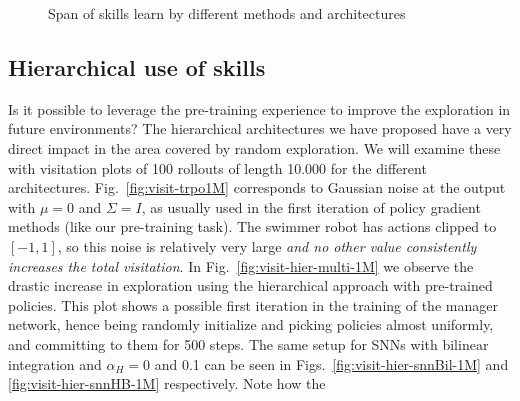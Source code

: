 \documentclass{article} %
\begin{document}
\begin{figure}[h]
{	}
	\caption{Span of skills learn by different methods and architectures}
	\label{fig:visit_methods}
\end{figure}


\subsection{Hierarchical use of skills}

Is it possible to leverage the pre-training experience to improve the exploration in future environments? The hierarchical architectures we have proposed have a very direct impact in the area covered by random exploration. We will examine these with visitation plots of 100 rollouts of length 10.000 for the different architectures. Fig.\ \ref{fig:visit-trpo1M} corresponds to Gaussian noise at the output with $\mu=0$ and $\Sigma=I$, as usually used in the first iteration of policy gradient methods (like our pre-training task). The swimmer robot has actions clipped to $[-1,1]$, so this noise is relatively very large \textit{and no other value consistently increases the total visitation}. In Fig.\ \ref{fig:visit-hier-multi-1M} we observe the drastic increase in exploration using the hierarchical approach with pre-trained policies. This plot shows a possible first iteration in the training of the manager network, hence being randomly initialize and picking policies almost uniformly, and committing to them for 500 steps. The same setup for SNNs with bilinear integration and $\alpha_H= 0$ and 0.1 can be seen in Figs.\ \ref{fig:visit-hier-snnBil-1M} and \ref{fig:visit-hier-snnHB-1M} respectively. Note how the 
\end{document}
